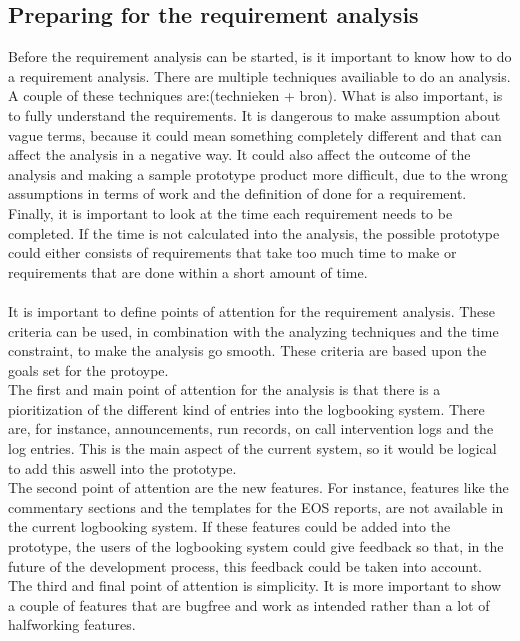 \documentclass[paper=a4, fontsize=11pt,twoside]{scrartcl}	%
\begin{document}
\subsection{Preparing for the requirement analysis}
Before the requirement analysis can be started, is it important to know how to do a requirement analysis. There are multiple techniques availiable to do an analysis. A couple of these techniques are:(technieken + bron). 
What is also important, is to fully understand the requirements. It is dangerous to make assumption about vague terms, because it could mean something completely different and that can affect the analysis in a negative way. It could also affect the outcome of the analysis and making a sample prototype product more difficult, due to the wrong assumptions in terms of work and the definition of done for a requirement.
Finally, it is important to look at the time each requirement needs to be completed. If the time is not calculated into the analysis, the possible   prototype could either consists of requirements that take too much time to make or requirements that are done within a short amount of time.
\\ \\
It is important to define points of attention for the requirement analysis. These criteria can be used, in combination with the analyzing techniques and the time constraint, to make the analysis go smooth. These criteria are based upon the goals set for the protoype. \\
The first and main point of attention for the analysis is that there is a pioritization of the different kind of entries into the logbooking system. There are, for instance, announcements, run records, on call intervention logs and the log entries. This is the main aspect of the current system, so it would be logical to add this aswell into the prototype. \\
The second point of attention are the new features. For instance, features like the commentary sections and the templates for the EOS reports, are not available in the current logbooking system. If these features could be added into the prototype, the users of the logbooking system could give feedback so that, in the future of the development process, this feedback could be taken into account. \\
The third and final point of attention is simplicity. It is more important to show a couple of features that are bugfree and work as intended rather than a lot of halfworking features.
\\ \\
\end{document}
